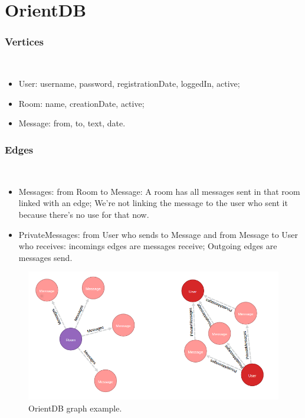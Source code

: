 \section{OrientDB} 
\label{app:orientdb}


\subsubsection{Vertices}\\
\begin{itemize}
\item User: username, password, registrationDate, loggedIn, active;\\
\item Room: name, creationDate, active;\\
\item Message: from, to, text, date.
\end{itemize}


\subsubsection{Edges}\\
\begin{itemize}
\item Messages: from Room to Message: A room has all messages sent in that room linked with an edge; We're not linking the message to the user who sent it because there's no use for that now.\\
\item PrivateMessages: from User who sends to Message and from Message to User who receives: incomings edges are messages receive; Outgoing edges are messages send.\\
\end{itemize}


\begin{figure}
\centering
\includegraphics[width=\textwidth]{img/odb_graph.png}
\caption{OrientDB graph example.}
\label{fig:odbgraph}
\end{figure}
